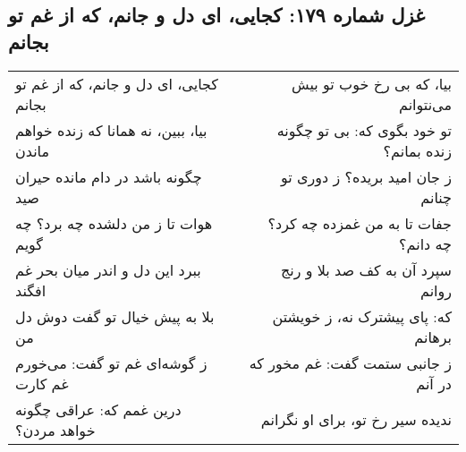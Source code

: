 \begin{center}
\section*{غزل شماره ۱۷۹: کجایی، ای دل و جانم، که از غم تو بجانم}
\label{sec:179}
\begin{longtable}{l p{0.5cm} r}
کجایی، ای دل و جانم، که از غم تو بجانم
&&
بیا، که بی رخ خوب تو بیش می‌نتوانم
\\
بیا، ببین، نه همانا که زنده خواهم ماندن
&&
تو خود بگوی که: بی تو چگونه زنده بمانم؟
\\
چگونه باشد در دام مانده حیران صید
&&
ز جان امید بریده؟ ز دوری تو چنانم
\\
هوات تا ز من دلشده چه برد؟ چه گویم
&&
جفات تا به من غمزده چه کرد؟ چه دانم؟
\\
ببرد این دل و اندر میان بحر غم افگند
&&
سپرد آن به کف صد بلا و رنج روانم
\\
بلا به پیش خیال تو گفت دوش دل من
&&
که: پای پیشترک نه، ز خویشتن برهانم
\\
ز گوشه‌ای غم تو گفت: می‌خورم غم کارت
&&
ز جانبی ستمت گفت: غم مخور که در آنم
\\
درین غمم که: عراقی چگونه خواهد مردن؟
&&
ندیده سیر رخ تو، برای او نگرانم
\\
\end{longtable}
\end{center}
